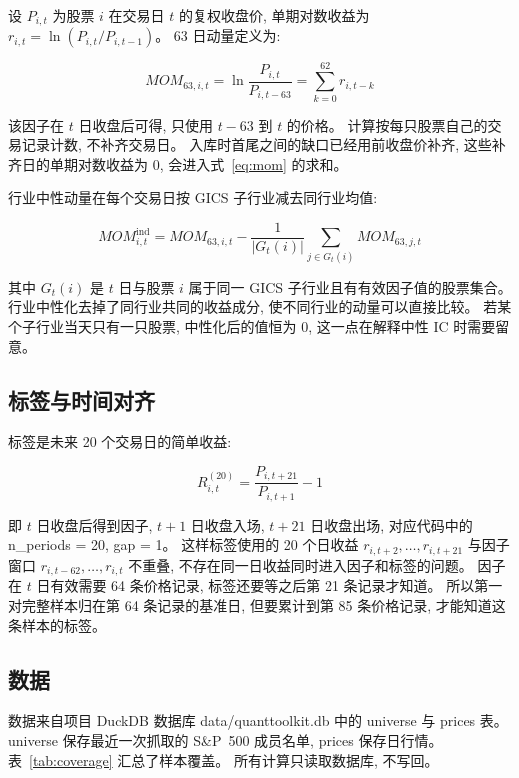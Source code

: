 \documentclass[11pt,a4paper]{article}
\newcommand{\SP}{S\&P~500}
\newcommand{\MOM}{\mathit{MOM}}
\begin{document}
设 $P_{i,t}$ 为股票 $i$ 在交易日 $t$ 的复权收盘价, 单期对数收益为 $r_{i,t}=\ln(P_{i,t}/P_{i,t-1})$。
63 日动量定义为:

\begin{equation}
\MOM_{63,i,t}
= \ln\frac{P_{i,t}}{P_{i,t-63}}
= \sum_{k=0}^{62} r_{i,t-k}
\label{eq:mom}
\end{equation}

该因子在 $t$ 日收盘后可得, 只使用 $t-63$ 到 $t$ 的价格。
计算按每只股票自己的交易记录计数, 不补齐交易日。
入库时首尾之间的缺口已经用前收盘价补齐, 这些补齐日的单期对数收益为 0, 会进入式~\eqref{eq:mom} 的求和。

行业中性动量在每个交易日按 GICS 子行业减去同行业均值:

\begin{equation}
\MOM^{\mathrm{ind}}_{i,t}
= \MOM_{63,i,t}
- \frac{1}{|G_t(i)|}\sum_{j\in G_t(i)}\MOM_{63,j,t}
\label{eq:neutral}
\end{equation}

其中 $G_t(i)$ 是 $t$ 日与股票 $i$ 属于同一 GICS 子行业且有有效因子值的股票集合。
行业中性化去掉了同行业共同的收益成分, 使不同行业的动量可以直接比较。
若某个子行业当天只有一只股票, 中性化后的值恒为 0, 这一点在解释中性 IC 时需要留意。

\subsection{标签与时间对齐}

标签是未来 20 个交易日的简单收益:

\begin{equation}
R_{i,t}^{(20)}
= \frac{P_{i,t+21}}{P_{i,t+1}}-1
\label{eq:label}
\end{equation}

即 $t$ 日收盘后得到因子, $t+1$ 日收盘入场, $t+21$ 日收盘出场, 对应代码中的 n\_periods = 20, gap = 1。
这样标签使用的 20 个日收益 $r_{i,t+2},\dots,r_{i,t+21}$ 与因子窗口 $r_{i,t-62},\dots,r_{i,t}$ 不重叠, 不存在同一日收益同时进入因子和标签的问题。
因子在 $t$ 日有效需要 64 条价格记录, 标签还要等之后第 21 条记录才知道。
所以第一对完整样本归在第 64 条记录的基准日, 但要累计到第 85 条价格记录, 才能知道这条样本的标签。

\subsection{数据}

数据来自项目 DuckDB 数据库 data/quanttoolkit.db 中的 universe 与 prices 表。
universe 保存最近一次抓取的 \SP{} 成员名单, prices 保存日行情。
表~\ref{tab:coverage} 汇总了样本覆盖。
所有计算只读取数据库, 不写回。
\end{document}
